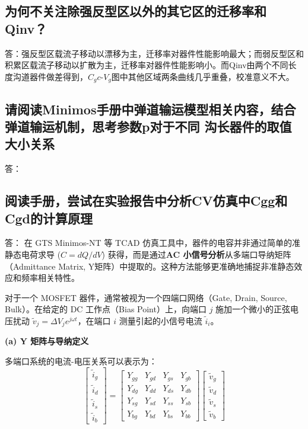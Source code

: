 \documentclass[12pt, a4paper, UTF8]{article}
\begin{document}
\subsection{为何不关注除强反型区以外的其它区的迁移率和Qinv？}
答：强反型区载流子移动以漂移为主，迁移率对器件性能影响最大；而弱反型区和积累区载流子移动以扩散为主，迁移率对器件性能影响小。而Qinv由两个不同长度沟道器件做差得到，$C_gc$-$V_g$图中其他区域两条曲线几乎重叠，校准意义不大。

\subsection{请阅读Minimos手册中弹道输运模型相关内容，结合弹道输运机制，思考参数p对于不同
沟长器件的取值大小关系}
答：

\subsection{阅读手册，尝试在实验报告中分析CV仿真中Cgg和Cgd的计算原理}
答：
在 GTS Minimos-NT 等 TCAD 仿真工具中，器件的电容并非通过简单的准静态电荷求导 ($C = dQ/dV$) 获得，而是通过\textbf{AC 小信号分析}从多端口导纳矩阵（Admittance Matrix, Y矩阵）中提取的。这种方法能够更准确地捕捉非准静态效应和频率相关特性。

对于一个 MOSFET 器件，通常被视为一个四端口网络（Gate, Drain, Source, Bulk）。在给定的 DC 工作点（Bias Point）上，向端口 $j$ 施加一个微小的正弦电压扰动 $\tilde{v}_j = \Delta V_j e^{j\omega t}$，在端口 $i$ 测量引起的小信号电流 $\tilde{i}_i$。

\textbf{(a) Y 矩阵与导纳定义}

多端口系统的电流-电压关系可以表示为：
\begin{equation}
\begin{bmatrix}
\tilde{i}_g \\
\tilde{i}_d \\
\tilde{i}_s \\
\tilde{i}_b
\end{bmatrix}
=
\begin{bmatrix}
Y_{gg} & Y_{gd} & Y_{gs} & Y_{gb} \\
Y_{dg} & Y_{dd} & Y_{ds} & Y_{db} \\
Y_{sg} & Y_{sd} & Y_{ss} & Y_{sb} \\
Y_{bg} & Y_{bd} & Y_{bs} & Y_{bb}
\end{bmatrix}
\begin{bmatrix}
\tilde{v}_g \\
\tilde{v}_d \\
\tilde{v}_s \\
\tilde{v}_b
\end{bmatrix}
\end{equation}
\end{document}
